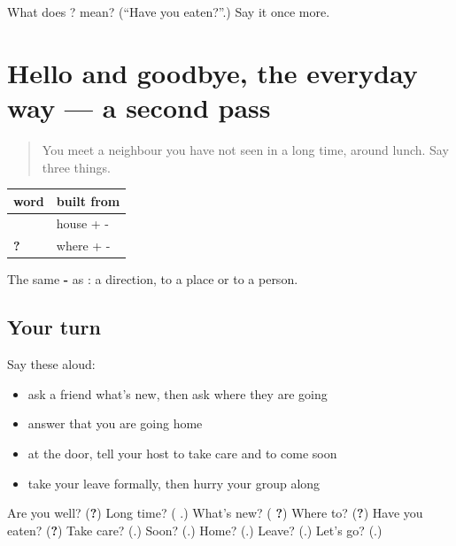 \begin{tcolorbox}[breakable,colback=teal!4,colframe=teal!35!black,title={Before you move on}]
What does ? mean? (\textquotedblleft{}Have you eaten?\textquotedblright{}.) Say it once more.
\end{tcolorbox}
\section[(dialogue)]{Hello and goodbye, the everyday way — a second pass}

\label{lesson:TE-R91-second-pass-greetings}



\begin{quote}
You meet a neighbour you have not seen in a long time, around lunch. Say three things.
\end{quote}

\begin{grammarlens}[title={Grammar Lens: the ending -\te{కి}, \textquotedblleft{}to\textquotedblright{}}]
\noindent
\begin{tabularx}{\linewidth}{@{}>{\raggedright\arraybackslash}X>{\raggedright\arraybackslash}X@{}}
\toprule
\textbf{word} & \textbf{built from} \\
\midrule
\textbf{\te{ఇంటికి}} & house + -\te{కి} \\
\textbf{\te{ఎక్కడికి}?} & where + -\te{కి} \\
\bottomrule
\end{tabularx}

The same \textbf{-} as \textbf{}: a direction, to a place or to a person.
\end{grammarlens}

\subsection*{Your turn}
Say these aloud:

\begin{itemize}
\raggedright
  \item ask a friend what's new, then ask where they are going
  \item answer that you are going home
  \item at the door, tell your host to take care and to come soon
  \item take your leave formally, then hurry your group along
\end{itemize}

\begin{tcolorbox}[breakable,colback=teal!4,colframe=teal!35!black,title={Before you move on}]
Are you well? (\textbf{?}) Long time? (\textbf{ }.) What's new? (\textbf{ ?}) Where to? (\textbf{?}) Have you eaten? (\textbf{?}) Take care? (\textbf{}.) Soon? (\textbf{}.) Home? (\textbf{}.) Leave? (\textbf{}.) Let's go? (\textbf{}.)
\end{tcolorbox}
